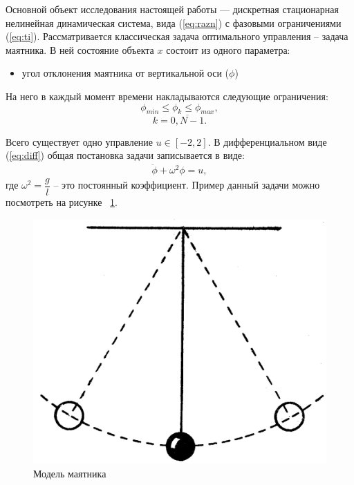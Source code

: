 Основной объект исследования настоящей работы — дискретная стационарная нелинейная динамическая система, вида (\ref{eq:razn}) с фазовыми ограничениями (\ref{eq:ti}). Рассматривается классическая задача оптимального управления -- задача маятника. В ней состояние объекта $x$ состоит из одного параметра:

\begin{itemize}
	\item угол отклонения маятника от вертикальной оси ($\phi$)
\end{itemize}

На него в каждый момент времени накладываются следующие ограничения:
$$\phi_{min} \leq \phi_k \leq \phi_{max},$$ 
$$		k = \overline{0, N-1}.$$

Всего существует одно  управление $u \in [-2, 2]$. В дифференциальном виде (\ref{eq:diff}) общая постановка задачи записывается в виде:
\begin{equation}
	\begin{aligned}
		\ddot{\phi} + \omega^2 \phi = u, 
	\end{aligned}
	\label{eq:main}
\end{equation}
где $\omega^2 = \dfrac{g}{l}$ -- это постоянный коэффициент. 
Пример данный задачи можно посмотреть на рисунке ~\ref{fig:pend}. 
\begin{figure}[h]
	\centering
	\includegraphics[scale=0.3]{mayat.png}
	\caption {Модель маятника}
	\label{fig:pend}
\end{figure}

